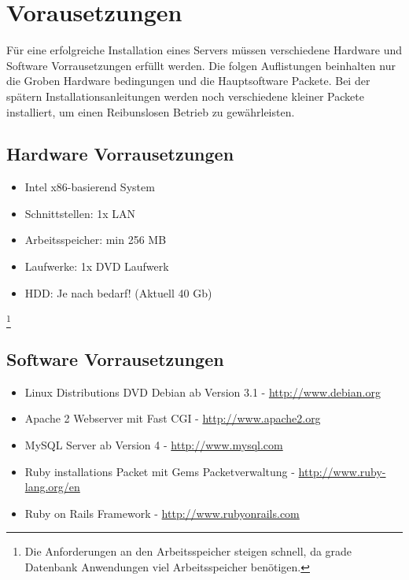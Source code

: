 \chapter{Vorausetzungen }  %
\label{chapter:Vorausetzungen}  %

Für eine erfolgreiche Installation eines Servers müssen verschiedene Hardware und Software Vorrausetzungen erfüllt werden. Die folgen Auflistungen beinhalten nur die Groben Hardware bedingungen und die Hauptsoftware Packete. Bei der spätern Installationsanleitungen werden noch verschiedene kleiner Packete installiert, um einen Reibunslosen Betrieb zu gewährleisten. \\
\section{Hardware Vorrausetzungen}
\label{section:Hardware Vorraussetzungen}
\begin{itemize}
\item Intel x86-basierend System 
\item Schnittstellen: 1x LAN
\item Arbeitsspeicher: min 256 MB \footnotemark[1]
\item Laufwerke: 1x DVD Laufwerk
\item HDD: Je nach bedarf! (Aktuell 40 Gb)
\end{itemize}
\footnote[1]{Die Anforderungen an den Arbeitsspeicher steigen schnell, da grade Datenbank Anwendungen viel Arbeitsspeicher benötigen.}

\section{Software Vorrausetzungen}
\label{section:Software Vorraussetzungen}
\begin{itemize}
\item Linux Distributions DVD Debian ab Version 3.1 - \href{http://www.debian.org}{http://www.debian.org}
\item Apache 2 Webserver mit Fast CGI -
\href{http://www.apache2.org}{http://www.apache2.org}
\item MySQL Server ab Version 4 - 
\href{http://dev.mysql.com}{http://www.mysql.com}
\item Ruby installations Packet mit Gems Packetverwaltung - \href{http://www.ruby-lang.org/en/}{http://www.ruby-lang.org/en}
\item Ruby on Rails Framework -
\href{http://www.rubyonrails.com/}{http://www.rubyonrails.com}
\end{itemize}
